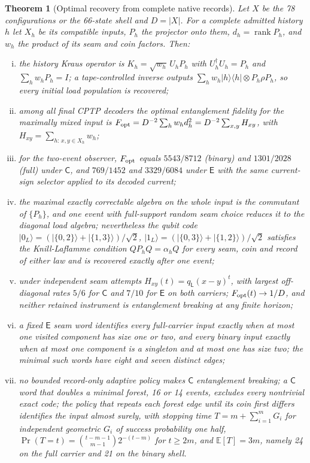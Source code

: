\documentclass[11pt]{article}
\newtheorem{theorem}{Theorem}[section]
\theoremstyle{definition}
\theoremstyle{remark}
\theoremstyle{plain}
\newcommand{\ket}[1]{\lvert #1\rangle}
\newcommand{\proj}[1]{\lvert #1\rangle\langle #1\rvert}
\newcommand{\Ex}{\mathbb{E}}
\newcommand{\Cn}{\mathsf{C}}
\newcommand{\En}{\mathsf{E}}
\newcommand{\rk}{\operatorname{rank}}
\begin{document}
\begin{theorem}[Optimal recovery from complete native records]
\label{thm:recovery}
Let $X$ be the 78 configurations or the 66-state shell and $D=\lvert X\rvert$.
For a complete admitted history $h$ let $X_h$ be its compatible inputs, $P_h$
the projector onto them, $d_h=\rk P_h$, and $w_h$ the product of its seam and
coin factors. Then:
\begin{enumerate}[(i)]
\item the history Kraus operator is $K_h=\sqrt{w_h}\,U_hP_h$ with
$U_h^\dagger U_h=P_h$ and $\sum_hw_hP_h=I$; a tape-controlled inverse outputs
$\sum_hw_h\proj h\otimes P_h\rho P_h$, so every initial load population is
recovered;
\item among all final CPTP decoders the optimal entanglement fidelity for the
maximally mixed input is
$F_{\rm opt}=D^{-2}\sum_hw_hd_h^2=D^{-2}\sum_{x,y}H_{xy}$, with
$H_{xy}=\sum_{h:\,x,y\in X_h}w_h$;
\item for the two-event observer, $F_{\rm opt}$ equals $5543/8712$ (binary) and
$1301/2028$ (full) under $\Cn$, and $769/1452$ and $3329/6084$ under $\En$
with the same current-sign selector applied to its decoded current;
\item the maximal exactly correctable algebra on the whole input is the
commutant of $\{P_h\}$, and one event with full-support random seam choice
reduces it to the diagonal load algebra; nevertheless the qubit code
$\ket{0_L}=(\ket{\{0,2\}}+\ket{\{1,3\}})/\sqrt2$,
$\ket{1_L}=(\ket{\{0,3\}}+\ket{\{1,2\}})/\sqrt2$ satisfies the
Knill-Laflamme condition $QP_hQ=\alpha_hQ$ for every seam, coin and record of
either law and is recovered exactly after one event;
\item under independent seam attempts $H_{xy}(t)=q_{\mathsf L}(x-y)^t$, with
largest off-diagonal rates $5/6$ for $\Cn$ and $7/10$ for $\En$ on both
carriers; $F_{\rm opt}(t)\to1/D$, and neither retained instrument is
entanglement breaking at any finite horizon;
\item a fixed $\En$ seam word identifies every full-carrier input exactly
when at most one visited component has size one or two, and every binary
input exactly when at most one component is a singleton and at most one has
size two; the minimal such words have eight and seven distinct edges;
\item no bounded record-only adaptive policy makes $\Cn$ entanglement
breaking; a $\Cn$ word that doubles a minimal forest, 16 or 14 events,
excludes every nontrivial exact code; the policy that repeats each forest edge until its
coin first differs identifies the input almost surely, with stopping time
$T=m+\sum_{i=1}^mG_i$ for independent geometric $G_i$ of success probability
one half, $\Pr(T=t)=\binom{t-m-1}{m-1}2^{-(t-m)}$ for $t\ge2m$, and
$\Ex[T]=3m$, namely 24 on the full carrier and 21 on the binary shell.
\end{enumerate}
\end{theorem}
\end{document}
